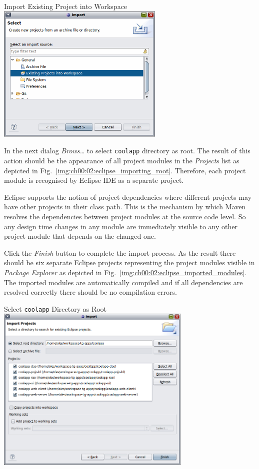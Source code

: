   \begin{image}{Import Existing Project into Workspace}{\label{img:ch00:02:eclipse_importing_existing}}        
    \includegraphics[width=0.6\textwidth]{parts/00-part/chapters/01-application-modules/images/09-eclipse-importing.png}
  \end{image}

  In the next dialog \emph{Brows\ldots} to select \texttt{coolapp} directory as root.
  The result of this action should be the appearance of all project modules in the \emph{Projects} list as depicted in Fig.~\ref{img:ch00:02:eclipse_importing_root}.  
  Therefore, each project module is recognised by Eclipse IDE as a separate project.
  
  Eclipse supports the notion of project dependencies where different projects may have other projects in their class path.
  This is the mechanism by which Maven resolves the dependencies between project modules at the source code level.
  So any design time changes in any module are immediately visible to any other project module that depends on the changed one.

  Click the \emph{Finish} button to complete the import process.
  As the result there should be six separate Eclipse projects representing the project modules visible in \emph{Package Explorer} as depicted in Fig.~\ref{img:ch00:02:eclipse_imported_modules}.
  The imported modules are automatically compiled and if all dependencies are resolved correctly there should be no compilation errors.

  \begin{image}{Select \texttt{coolapp} Directory as Root}{\label{img:ch00:02:eclipse_importing_root}}    
    \includegraphics[width=0.7\textwidth]{parts/00-part/chapters/01-application-modules/images/10-eclipse-importing.png}
  \end{image}
 
